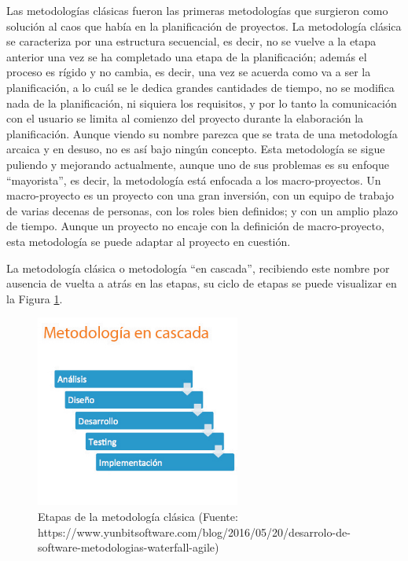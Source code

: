 Las metodologías clásicas fueron las primeras metodologías que surgieron como solución al caos que había en la planificación de proyectos. La metodología clásica se caracteriza por una estructura secuencial, es decir, no se vuelve a la etapa anterior una vez se ha completado una etapa de la planificación; además el proceso es rígido y no cambia, es decir, una vez se acuerda como va a ser la planificación, a lo cuál se le dedica grandes cantidades de tiempo, no se modifica nada de la planificación, ni siquiera los requisitos, y por lo tanto la comunicación con el usuario se limita al comienzo del proyecto durante la elaboración la planificación. Aunque viendo su nombre parezca que se trata de una metodología arcaica y en desuso, no es así bajo ningún concepto. Esta metodología se sigue puliendo y mejorando actualmente, aunque uno de sus problemas es su enfoque ``mayorista'', es decir, la metodología está enfocada a los macro-proyectos. Un macro-proyecto es un proyecto con una gran inversión, con un equipo de trabajo de varias decenas de personas, con los roles bien definidos; y con un amplio plazo de tiempo. Aunque un proyecto no encaje con la definición de macro-proyecto, esta metodología se puede adaptar al proyecto en cuestión.

La metodología clásica o metodología ``en cascada'', recibiendo este nombre por ausencia de vuelta a atrás en las etapas, su ciclo de etapas se puede visualizar en la Figura \ref{fig:etapas_clasica}.

\begin{figure}[h]
    \centering
    \includegraphics[width=0.6\textwidth]{imagenes/03_Planificacion/meto_clasica.jpg}
    \caption{Etapas de la metodología clásica (Fuente: https://www.yunbitsoftware.com/blog/2016/05/20/desarrolo-de-software-metodologias-waterfall-agile)}
    \label{fig:etapas_clasica}
\end{figure}

